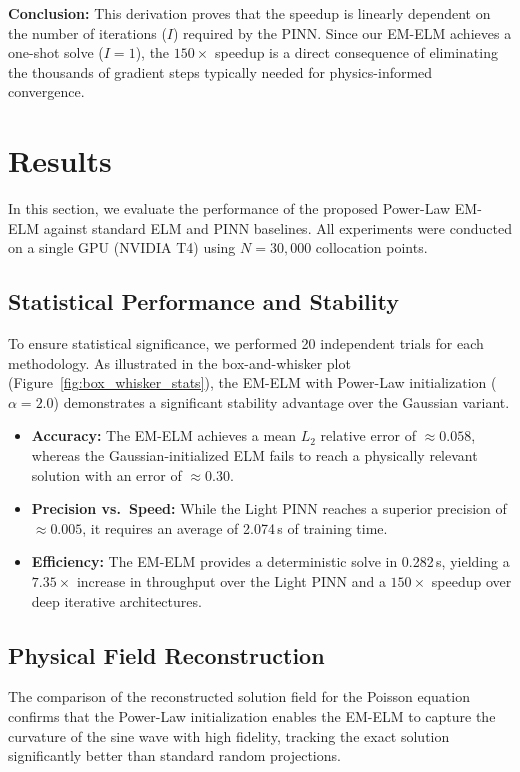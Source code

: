 \documentclass[final,12pt,3p,times,fleqn]{elsarticle}
\begin{document}
\textbf{Conclusion:} This derivation proves that the speedup is linearly dependent on the number of iterations ($I$) required by the PINN. Since our EM-ELM achieves a one-shot solve ($I=1$), the $150 \times$ speedup is a direct consequence of eliminating the thousands of gradient steps typically needed for physics-informed convergence.


\section{Results}
In this section, we evaluate the performance of the proposed Power-Law EM-ELM against standard ELM and PINN baselines. All experiments were conducted on a single GPU (NVIDIA T4) using $N=30{,}000$ collocation points.

\subsection{Statistical Performance and Stability}

To ensure statistical significance, we performed 20 independent trials for each methodology. As illustrated in the box-and-whisker plot (Figure~\ref{fig:box_whisker_stats}), the EM-ELM with Power-Law initialization ($\alpha=2.0$) demonstrates a significant stability advantage over the Gaussian variant.
\begin{itemize}
    \item \textbf{Accuracy:} The EM-ELM achieves a mean $L_2$ relative error of $\approx 0.058$, whereas the Gaussian-initialized ELM fails to reach a physically relevant solution with an error of $\approx 0.30$.
    \item \textbf{Precision vs.\ Speed:} While the Light PINN reaches a superior precision of $\approx 0.005$, it requires an average of 2.074\,s of training time.
    \item \textbf{Efficiency:} The EM-ELM provides a deterministic solve in 0.282\,s, yielding a $7.35\times$ increase in throughput over the Light PINN and a $150\times$ speedup over deep iterative architectures.
\end{itemize}

\subsection{Physical Field Reconstruction}

The comparison of the reconstructed solution field for the Poisson equation confirms that the Power-Law initialization enables the EM-ELM to capture the curvature of the sine wave with high fidelity, tracking the exact solution significantly better than standard random projections.
\end{document}
